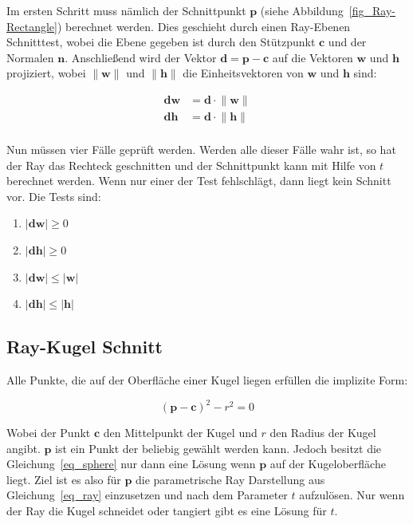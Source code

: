 Im ersten Schritt muss nämlich der Schnittpunkt $\mathbf{p}$ (siehe Abbildung~\ref{fig_Ray-Rectangle}) 
berechnet werden. Dies geschieht durch einen Ray-Ebenen Schnitttest, wobei die Ebene gegeben ist durch
den Stützpunkt $\mathbf{c}$ und der Normalen $\mathbf{n}$. Anschließend wird der Vektor $\mathbf{d} = 
\mathbf{p} - \mathbf{c}$ auf die Vektoren $\mathbf{w}$ und $\mathbf{h}$ projiziert, wobei 
$\mathbf{\|w\|}$ und $\mathbf{\|h\|}$ die Einheitsvektoren von $\mathbf{w}$ und $\mathbf{h}$ sind:

\begin{align*}
    \mathbf{dw}& = \mathbf{d} \cdot \mathbf{\|w\|}\\
    \mathbf{dh}& = \mathbf{d} \cdot \mathbf{\|h\|}\\
\end{align*}

Nun müssen vier Fälle geprüft werden. Werden alle dieser Fälle wahr ist, so hat der Ray das Rechteck geschnitten
und der Schnittpunkt kann mit Hilfe von $\mathit{t}$ berechnet werden. Wenn nur einer der Test fehlschlägt, dann
liegt kein Schnitt vor. Die Tests sind:

\begin{enumerate}
\centering
\item $\mathbf{|dw|} \geq 0$
\item $\mathbf{|dh|} \geq 0$
\item $\mathbf{|dw|} \leq \mathbf{|w|}$
\item $\mathbf{|dh|} \leq \mathbf{|h|}$
\end{enumerate}



\subsection{Ray-Kugel Schnitt}

Alle Punkte, die auf der Oberfläche einer Kugel liegen erfüllen die implizite Form:

\begin{equation}
    (\mathbf{p} - \mathbf{c})^{2} - \mathit{r}^2 = 0
    \label{eq_sphere}
\end{equation}

Wobei der Punkt $\mathbf{c}$ den Mittelpunkt der Kugel und $\mathit{r}$ den Radius der Kugel
angibt. $\mathbf{p}$ ist ein Punkt der beliebig gewählt werden kann. Jedoch besitzt die
Gleichung~\ref{eq_sphere} nur dann eine Lösung wenn $\mathbf{p}$ auf der Kugeloberfläche liegt.
Ziel ist es also für $\mathbf{p}$ die parametrische Ray Darstellung aus Gleichung~\ref{eq_ray}
einzusetzen und nach dem Parameter $\mathit{t}$ aufzulösen. Nur wenn der Ray die Kugel schneidet
oder tangiert gibt es eine Lösung für $\mathit{t}$.

